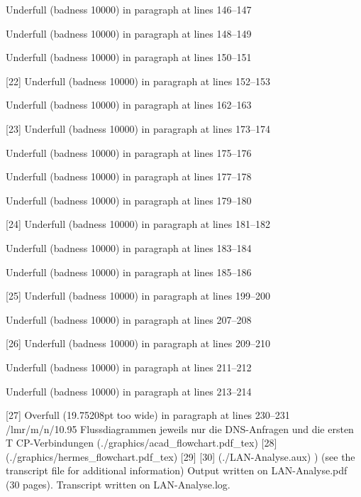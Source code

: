Underfull \hbox (badness 10000) in paragraph at lines 146--147


Underfull \hbox (badness 10000) in paragraph at lines 148--149


Underfull \hbox (badness 10000) in paragraph at lines 150--151

[22]
Underfull \hbox (badness 10000) in paragraph at lines 152--153


Underfull \hbox (badness 10000) in paragraph at lines 162--163

[23]
Underfull \hbox (badness 10000) in paragraph at lines 173--174


Underfull \hbox (badness 10000) in paragraph at lines 175--176


Underfull \hbox (badness 10000) in paragraph at lines 177--178


Underfull \hbox (badness 10000) in paragraph at lines 179--180

[24]
Underfull \hbox (badness 10000) in paragraph at lines 181--182


Underfull \hbox (badness 10000) in paragraph at lines 183--184


Underfull \hbox (badness 10000) in paragraph at lines 185--186

[25]
Underfull \hbox (badness 10000) in paragraph at lines 199--200


Underfull \hbox (badness 10000) in paragraph at lines 207--208

[26]
Underfull \hbox (badness 10000) in paragraph at lines 209--210


Underfull \hbox (badness 10000) in paragraph at lines 211--212


Underfull \hbox (badness 10000) in paragraph at lines 213--214

[27]
Overfull \hbox (19.75208pt too wide) in paragraph at lines 230--231
\TU/lmr/m/n/10.95 Flussdiagrammen jeweils nur die DNS-Anfragen und die ersten T
CP-Verbindungen
(./graphics/acad_flowchart.pdf_tex) [28] (./graphics/hermes_flowchart.pdf_tex)
[29] [30] (./LAN-Analyse.aux) )
(see the transcript file for additional information)
Output written on LAN-Analyse.pdf (30 pages).
Transcript written on LAN-Analyse.log.
